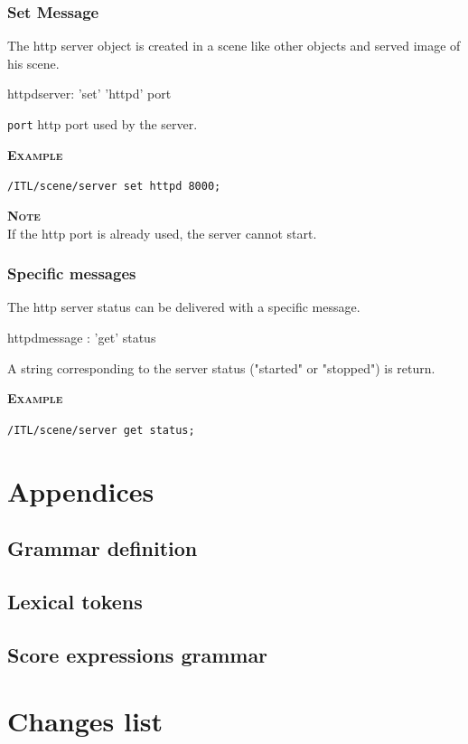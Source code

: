 \documentclass[a4paper,twoside]{report}
\newcommand{\toplevel}[1]	{\chapter{#1}}
\newcommand{\sublevel}[1]	{\section{#1}}
\newcommand{\subsublevel}[1]	{\subsection{#1}}
\newcommand{\OSC}[1]		{\texttt{#1}}
\newcommand{\example}		{\textbf{\hspace{-1.5cm}\textbf{\textsc{Example }}}}
\newcommand{\note}	[1]		{\vspace{2mm}\textbf{\hspace{-0.9cm}\textbf{\textsc{Note #1}}}}
\let\olditemize\itemize
\let\oldenditemize\enditemize
\renewenvironment{itemize} 	{\olditemize \setlength{\itemsep}{1mm}}{\oldenditemize}
\newcommand{\sample}	[1]			{\vspace{-2mm}\begin{center}\colorbox{mygrey}{
								\begin{minipage}[t]{0.9\columnwidth} 
								{\small \texttt{#1}}
								\end{minipage}}\end{center}}
\begin{document}
\subsublevel{Set Message}

The http server object is created in a scene like other objects and served image of his scene.

\begin{rail}
httpdserver: 'set' 'httpd' port
\end{rail}

\begin{itemize}
\item \OSC{port} http port used by the server.
\end{itemize}

\example \\
\sample{/ITL/scene/server set httpd 8000;}

\note{} \\
If the http port is already used, the server cannot start.

\subsublevel{Specific messages}
\label{httpdmsg}
The http server status can be delivered with a specific message.

\begin{rail}
httpdmessage : 'get' status
\end{rail}


A string corresponding to the server status ("started" or "stopped") is return.

\example \\
\sample{/ITL/scene/server get status;}

\toplevel{Appendices}
\sublevel{Grammar definition}
\label{yacc}


\sublevel{Lexical tokens}
\label{lex}


\sublevel{Score expressions grammar}
\label{yaccexpr}



\toplevel{ Changes list}
\label{changes}



\printindex
\end{document}
